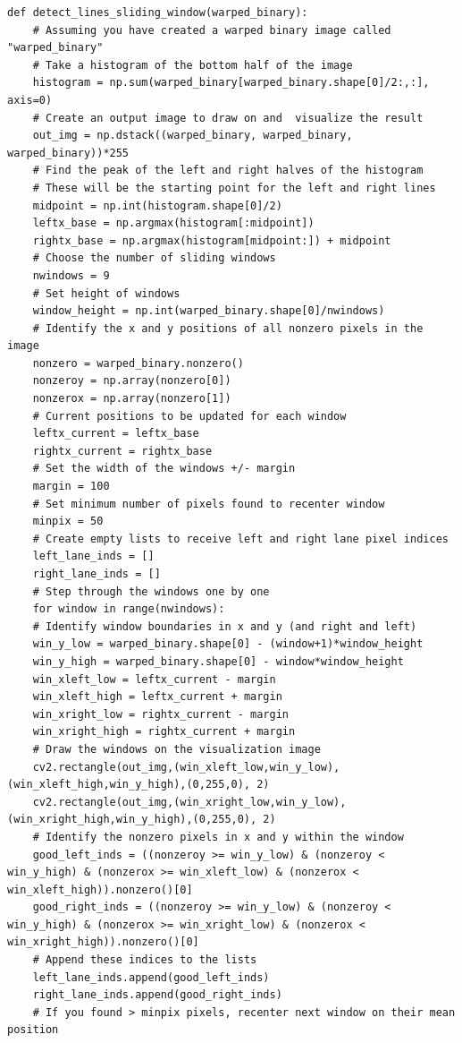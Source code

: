 \documentclass[11pt]{article}
\begin{document}
\begin{verbatim}
def detect_lines_sliding_window(warped_binary):
    # Assuming you have created a warped binary image called "warped_binary"
    # Take a histogram of the bottom half of the image
    histogram = np.sum(warped_binary[warped_binary.shape[0]/2:,:], axis=0)
    # Create an output image to draw on and  visualize the result
    out_img = np.dstack((warped_binary, warped_binary, warped_binary))*255
    # Find the peak of the left and right halves of the histogram
    # These will be the starting point for the left and right lines
    midpoint = np.int(histogram.shape[0]/2)
    leftx_base = np.argmax(histogram[:midpoint])
    rightx_base = np.argmax(histogram[midpoint:]) + midpoint
    # Choose the number of sliding windows
    nwindows = 9
    # Set height of windows
    window_height = np.int(warped_binary.shape[0]/nwindows)
    # Identify the x and y positions of all nonzero pixels in the image
    nonzero = warped_binary.nonzero()
    nonzeroy = np.array(nonzero[0])
    nonzerox = np.array(nonzero[1])
    # Current positions to be updated for each window
    leftx_current = leftx_base
    rightx_current = rightx_base
    # Set the width of the windows +/- margin
    margin = 100
    # Set minimum number of pixels found to recenter window
    minpix = 50
    # Create empty lists to receive left and right lane pixel indices
    left_lane_inds = []
    right_lane_inds = []
    # Step through the windows one by one
    for window in range(nwindows):
	# Identify window boundaries in x and y (and right and left)
	win_y_low = warped_binary.shape[0] - (window+1)*window_height
	win_y_high = warped_binary.shape[0] - window*window_height
	win_xleft_low = leftx_current - margin
	win_xleft_high = leftx_current + margin
	win_xright_low = rightx_current - margin
	win_xright_high = rightx_current + margin
	# Draw the windows on the visualization image
	cv2.rectangle(out_img,(win_xleft_low,win_y_low),(win_xleft_high,win_y_high),(0,255,0), 2) 
	cv2.rectangle(out_img,(win_xright_low,win_y_low),(win_xright_high,win_y_high),(0,255,0), 2) 
	# Identify the nonzero pixels in x and y within the window
	good_left_inds = ((nonzeroy >= win_y_low) & (nonzeroy < win_y_high) & (nonzerox >= win_xleft_low) & (nonzerox < win_xleft_high)).nonzero()[0]
	good_right_inds = ((nonzeroy >= win_y_low) & (nonzeroy < win_y_high) & (nonzerox >= win_xright_low) & (nonzerox < win_xright_high)).nonzero()[0]
	# Append these indices to the lists
	left_lane_inds.append(good_left_inds)
	right_lane_inds.append(good_right_inds)
	# If you found > minpix pixels, recenter next window on their mean position

\end{verbatim}
\end{document}

